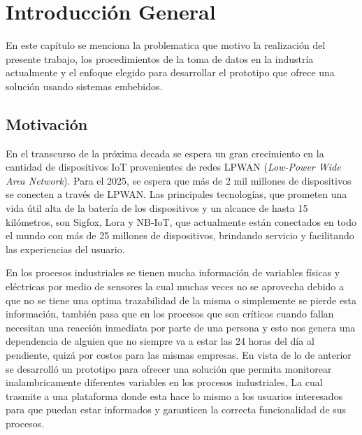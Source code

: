 
\chapter{Introducción General} %
En este capítulo se menciona la problematica que motivo la realización del presente trabajo, los procedimientos de la toma de datos en la industría actualmente y el enfoque elegido para desarrollar el prototipo que ofrece una solución usando sistemas embebidos.
\label{Chapter1} %
\label{IntroGeneral}


\newcommand{\keyword}[1]{\textbf{#1}}
\newcommand{\tabhead}[1]{\textbf{#1}}
\newcommand{\code}[1]{\texttt{#1}}
\newcommand{\file}[1]{\texttt{\bfseries#1}}
\newcommand{\option}[1]{\texttt{\itshape#1}}
\newcommand{\grados}{$^{\circ}$}



\section{Motivación}
En el transcurso de la próxima decada se espera un gran crecimiento en la cantidad de dispositivos IoT provenientes de redes LPWAN (\textit{Low-Power Wide Area Network}). Para el 2025, se espera que más de 2 mil millones de dispositivos se conecten a través de LPWAN. Las principales tecnologías, que prometen una vida útil alta de la batería de los dispositivos y un alcance de hasta 15 kilómetros, son Sigfox, Lora y NB-IoT, que actualmente están conectados en todo el mundo con más de 25 millones de dispositivos, brindando servicio y facilitando las experiencias del usuario.


En los procesos industriales se tienen mucha información de variables físicas y eléctricas por medio de sensores la cual muchas veces no se aprovecha debido a que no se tiene una optima trazabilidad de la misma o simplemente se pierde esta información, también pasa que en los procesos que son críticos cuando fallan necesitan una reacción inmediata por parte de una persona y esto nos genera una dependencia de alguien que no siempre va a estar las 24 horas del día al pendiente, quizá por costos para las mismas empresas. En vista de lo de anterior se desarrolló un prototipo para ofrecer una solución que permita monitorear inalambricamente diferentes variables en los procesos industriales, La cual trasmite a una plataforma donde esta hace lo mismo a los usuarios interesados para que puedan estar informados y garanticen la correcta funcionalidad de sus procesos.

